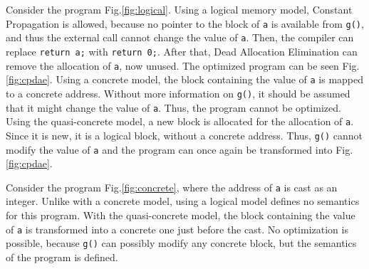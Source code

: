 Consider the program Fig.\ref{fig:logical}. Using a logical memory model, Constant Propagation is allowed, because no pointer to the block of \texttt{a} is available from \texttt{g()}, and thus the external call cannot change the value of \texttt{a}. Then, the compiler can replace \texttt{return a;} with \texttt{return 0;}. After that, Dead Allocation Elimination can remove the allocation of \texttt{a}, now unused. The optimized program can be seen Fig.\ref{fig:cpdae}.
Using a concrete model, the block containing the value of \texttt{a} is mapped to a concrete address. Without more information on \texttt{g()}, it should be assumed that it might change the value of \texttt{a}. Thus, the program cannot be optimized.
Using the quasi-concrete model, a new block is allocated for the allocation of \texttt{a}. Since it is new, it is a logical block, without a concrete address. Thus, \texttt{g()} cannot modify the value of \texttt{a} and the program can once again be transformed into Fig.\ref{fig:cpdae}.

Consider the program Fig.\ref{fig:concrete}, where the address of \texttt{a} is cast as an integer. Unlike with a concrete model, using a logical model defines no semantics for this program. With the quasi-concrete model, the block containing the value of \texttt{a} is transformed into a concrete one just before the cast. No optimization is possible, because \texttt{g()} can possibly modify any concrete block, but the semantics of the program is defined.


